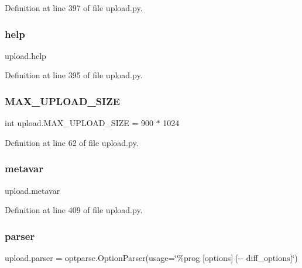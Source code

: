 Definition at line 397 of file upload.\+py.

\mbox{\label{namespaceupload_abfc23c9aa2d9b777678da117a85929a5}} 
\subsubsection{\texorpdfstring{help}{help}}
{\footnotesize\ttfamily upload.\+help}



Definition at line 395 of file upload.\+py.

\mbox{\label{namespaceupload_aad5b1a43823e2a710a2f78e33dde8901}} 
\subsubsection{\texorpdfstring{M\+A\+X\+\_\+\+U\+P\+L\+O\+A\+D\+\_\+\+S\+I\+ZE}{MAX\_UPLOAD\_SIZE}}
{\footnotesize\ttfamily int upload.\+M\+A\+X\+\_\+\+U\+P\+L\+O\+A\+D\+\_\+\+S\+I\+ZE = 900 $\ast$ 1024}



Definition at line 62 of file upload.\+py.

\mbox{\label{namespaceupload_af1cea8af5389f0ab2d8b65b2c0fd2fe0}} 
\subsubsection{\texorpdfstring{metavar}{metavar}}
{\footnotesize\ttfamily upload.\+metavar}



Definition at line 409 of file upload.\+py.

\mbox{\label{namespaceupload_af9e508d19dc2dd9cdb7c642dde0bdd21}} 
\subsubsection{\texorpdfstring{parser}{parser}}
{\footnotesize\ttfamily upload.\+parser = optparse.\+Option\+Parser(usage=\char`\"{}\%prog \mbox{[}options\mbox{]} \mbox{[}-\/-\/ diff\+\_\+options\mbox{]}\char`\"{})}



